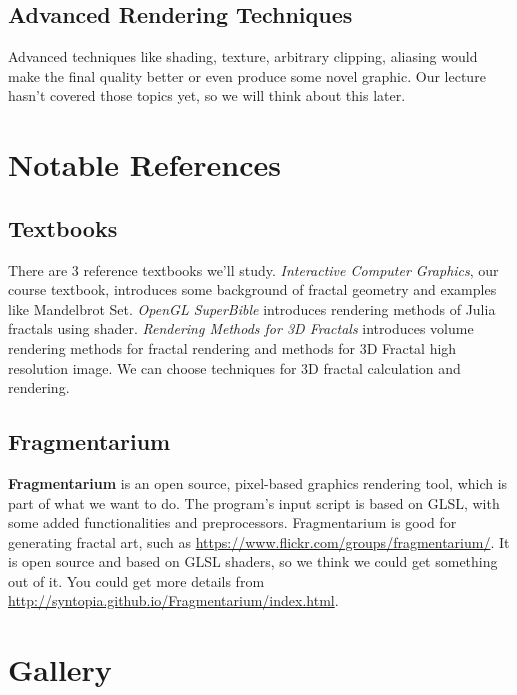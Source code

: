\documentclass[a4paper]{article}
\begin{document}
\subsection{Advanced Rendering Techniques}
Advanced techniques like shading, texture, arbitrary clipping, aliasing would make the final quality better or even produce some novel graphic.
Our lecture hasn't covered those topics yet, so we will think about this later.
\section{Notable References}
\subsection{Textbooks}
There are 3 reference textbooks we'll study.
\textit{Interactive Computer Graphics}\cite{c1}, our course textbook, introduces some background of fractal geometry and examples like Mandelbrot Set.
\textit{OpenGL SuperBible}\cite{c2} introduces rendering methods of Julia fractals using shader.
\textit{Rendering Methods for 3D Fractals}\cite{c3} introduces volume rendering methods for fractal rendering and methods for 3D Fractal high resolution image. We can choose techniques for 3D fractal calculation and rendering.

\subsection{Fragmentarium}
\textbf{Fragmentarium} is an open source, pixel-based graphics rendering tool, which is part of what we want to do.
The program's input script is based on GLSL, with some added functionalities and preprocessors.
Fragmentarium is good for generating fractal art, such as \url{https://www.flickr.com/groups/fragmentarium/}.
It is open source and based on GLSL shaders, so we think we could get something out of it.
You could get more details from \url{http://syntopia.github.io/Fragmentarium/index.html}.

\section{Gallery}
\begin{figure}[H]
\centering
{}
\end{figure}
\end{document}
